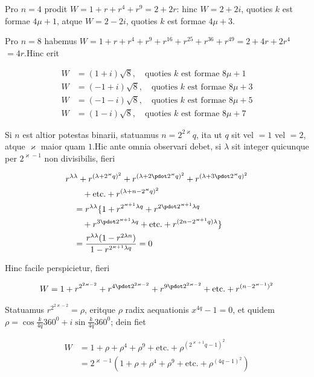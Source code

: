 Pro $n=4$ prodit $W=1+r+r^4+r^9=2+2r$: hinc $W=2+2i$, quoties $k$ est formae $4\mu+1$, atque $W=2-2i$, quoties $k$ est formae $4\mu+3$.

Pro $n=8$ habemus $W=1+r+r^4+r^9+r^{16}+r^{25}+r^{36}+r^{49}=2+4r+2r^4$ $=4r$.\quad Hinc erit

\[
\begin{aligned}
W&=(1+i)\surd8,\quad\text{quoties }k\text{ est formae }8\mu+1\\
W&=(-1+i)\surd8,\quad\text{quoties }k\text{ est formae }8\mu+3\\
W&=(-1-i)\surd8,\quad\text{quoties }k\text{ est formae }8\mu+5\\
W&=(1-i)\surd8,\quad\text{quoties }k\text{ est formae }8\mu+7
\end{aligned}
\]

Si $n$ est altior potestas binarii, statuamus $n=2^{2\varkappa}q$, ita ut $q$ sit vel $=1$ vel $=2$, atque $\varkappa$ maior quam $1$.\quad Hic ante omnia observari debet, si $\lambda$ sit integer quicunque per $2^{\varkappa-1}$ non divisibilis, fieri

\[
\begin{aligned}
&r^{\lambda\lambda}+r^{(\lambda+2^\varkappa q)^2}+r^{(\lambda+2\pdot2^\varkappa q)^2}+r^{(\lambda+3\pdot2^\varkappa q)^2}\\&\qquad+\text{etc.}+r^{(\lambda+n-2^\varkappa q)^2}\\
&\quad=r^{\lambda\lambda}\{1+r^{2^{\varkappa+1}\lambda q}+r^{2\pdot2^{\varkappa+1}\lambda q}\\&\qquad+r^{3\pdot2^{\varkappa+1}\lambda q}+\text{etc.}+r^{(2n-2^{\varkappa+1}q)\lambda}\}\\&\quad=\frac{r^{\lambda\lambda}(1-r^{2\lambda n})}{1-r^{2^{\varkappa+1}\lambda q}}=0
\end{aligned}
\]

Hinc facile perspicietur, fieri

\[
\begin{aligned}
W=1+r^{2^{2\varkappa-2}}+r^{4\pdot2^{2\varkappa-2}}+r^{9\pdot2^{2\varkappa-2}}+\text{etc.}+r^{(n-2^{\varkappa-1})^2}
\end{aligned}
\]


Statuamus $r^{2^{2\varkappa-2}}=\rho$, eritque $\rho$ radix aequationis $x^{4q}-1=0$, et quidem $\rho=\cos\frac{k}{4q}360^0+i\sin\frac{k}{4q}360^0$; dein fiet

\[
\begin{aligned}
W&=1+\rho+\rho^4+\rho^9+\text{etc.}+\rho^{(2^{\varkappa+1}q-1)^2}\\
&=2^{\varkappa-1}(1+\rho+\rho^4+\rho^9+\text{etc.}+\rho^{(4q-1)^2})
\end{aligned}
\]

